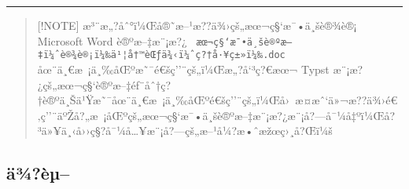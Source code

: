 \begin{center}\rule{0.5\linewidth}{0.5pt}\end{center}

\begin{quote}
{[}!NOTE{]} æ³¨æ„?åˆ°ï¼Œå®˜æ--¹æ??ä¾›çš„æœ¬ç§`æ¯•ä¸šè®¾è®¡ Microsoft
Word è®ºæ--‡æ¨¡æ?¿
\texttt{\ æœ¬ç§‘æ¯•ä¸šè®ºæ–‡ï¼ˆè®¾è®¡ï¼‰ä¹¦å†™èŒƒä¾‹ï¼ˆç?†å·¥ç±»ï¼‰.doc\ }
åœ¨ä¸€æ~¡ä¸‰åŒºæ˜¯é€šç''¨çš„ï¼Œæ„?å`³ç?€æœ¬ Typst
æ¨¡æ?¿çš„æœ¬ç§`è®ºæ--‡éƒ¨åˆ†ç?†è®ºä¸Šä¹Ÿæ˜¯åœ¨ä¸€æ~¡ä¸‰åŒºé€šç''¨çš„ï¼Œå›~æ­¤æˆ`ä»¬æ??ä¾›é€‚ç''¨äºŽå?„æ~¡åŒºçš„æœ¬ç§`æ¯•ä¸šè®ºæ--‡æ¨¡æ?¿æ¨¡å?---å¯¼å‡ºï¼Œå?³ä»¥ä¸‹å››ç§?å¯¼å\ldots¥æ¨¡å?---çš„æ--¹å¼?æ•ˆæžœç›¸å?Œï¼š

\begin{Shaded}
\begin{Highlighting}[]
\end{Highlighting}
\end{Shaded}

\begin{Shaded}
\begin{Highlighting}[]
\end{Highlighting}
\end{Shaded}

\begin{Shaded}
\begin{Highlighting}[]
\end{Highlighting}
\end{Shaded}

\begin{Shaded}
\begin{Highlighting}[]
\end{Highlighting}
\end{Shaded}
\end{quote}

\subsection{ä¾?èµ--}\label{uxe4uxbeuxe8uxb5}

